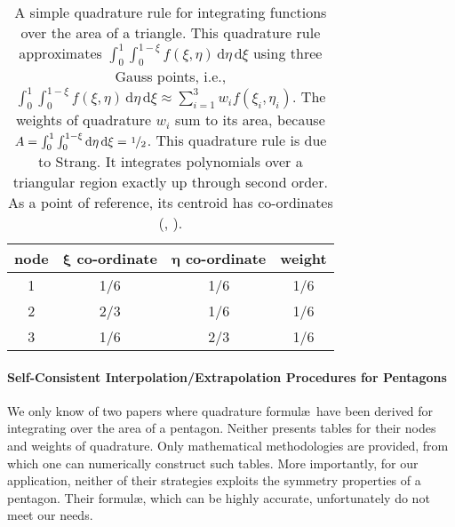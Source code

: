 \begin{table}
    \begin{center}
    \caption{A simple quadrature rule for integrating functions over the area of a triangle.  This quadrature rule approximates $\int_0^1 \int_0^{1-\xi} f(\xi , \eta) \, \mathrm{d} \eta \, \mathrm{d} \xi$  using three Gauss points, i.e., $\int_0^1 \int_0^{1-\xi} f(\xi , \eta) \, \mathrm{d} \eta \, \mathrm{d} \xi \approx \sum_{i=1}^3 w_i f(\xi_i , \eta_i )$.  The weights of quadrature $w_i$ sum to its area, because $A = \int_0^1 \int_0^{1-\xi} \mathrm{d}\eta \, \mathrm{d} \xi = \textfrac{1}{2}$.  This quadrature rule is due to Strang.  It integrates polynomials over a triangular region exactly up through second order. As a point of reference, its centroid has co-ordinates (, ).}
    \label{tab:3nodeTriangle}
    \footnotesize
    \begin{tabular}{cccc}
        \hline
        \textbf{node} & $\boldsymbol{\xi}$ \textbf{co-ordinate} & 
        $\boldsymbol{\eta}$ \textbf{co-ordinate}  & \textbf{weight} \\ \hline        
        1 & 1/6 & 1/6 & 1/6 \\ 
        2 & 2/3 & 1/6 & 1/6 \\ 
        3 & 1/6 & 2/3 & 1/6 \\ 
        \hline
    \end{tabular}
    \end{center}
\end{table}
    
\paragraph{Self-Consistent Interpolation\slash Extrapolation Procedures for Pentagons}
    \label{secPentagonGaussPts}
    
    We only know of two papers where quadrature formul\ae\ have been derived for integrating over the area of a pentagon. \cite{Mousavietal10,Chakrabortyetal18}  Neither presents tables for their nodes and weights of quadrature.  Only mathematical methodologies are provided, from which one can numerically construct such tables.  More importantly, for our application, neither of their strategies exploits the symmetry properties of a pentagon.  Their formul\ae, which can be highly accurate, unfortunately do not meet our needs. 
    

